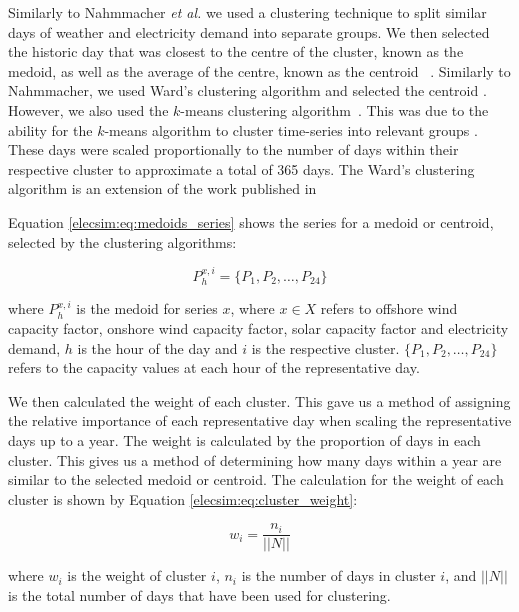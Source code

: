 Similarly to Nahmmacher \textit{et al.} we used a clustering technique to split similar days of weather and electricity demand into separate groups. We then selected the historic day that was closest to the centre of the cluster, known as the medoid, as well as the average of the centre, known as the centroid ~\cite{Nahmmacher2016}. Similarly to Nahmmacher, we used Ward's clustering algorithm and selected the centroid \cite{doi:10.1080/01621459.1963.10500845}. However, we also used the $k$-means clustering algorithm~\cite{forgy65}. This was due to the ability for the $k$-means algorithm to cluster time-series into relevant groups \cite{Kell2018}. These days were scaled proportionally to the number of days within their respective cluster to approximate a total of 365 days. The Ward's clustering algorithm is an extension of the work published in \cite{Kell2020}

Equation \ref{elecsim:eq:medoids_series} shows the series for a medoid or centroid, selected by the clustering algorithms:

\begin{equation}
\label{elecsim:eq:medoids_series}
P^{x,i}_{h}=\{P_1, P_2, \ldots, P_{24}\}
\end{equation}

\noindent where $P^{x,i}_{h}$ is the medoid for series $x$, where $x\in X$ refers to offshore wind capacity factor, onshore wind capacity factor, solar capacity factor and electricity demand, $h$ is the hour of the day and $i$ is the respective cluster. $\{P_1, P_2, \ldots , P_{24}\}$ refers to the capacity values at each hour of the representative day.

We then calculated the weight of each cluster. This gave us a method of assigning the relative importance of each representative day when scaling the representative days up to a year. The weight is calculated by the proportion of days in each cluster. This gives us a method of determining how many days within a year are similar to the selected medoid or centroid. The calculation for the weight of each cluster is shown by Equation \ref{elecsim:eq:cluster_weight}:

\begin{equation}
\label{elecsim:eq:cluster_weight}
w_i = \frac{n_i}{||N||} 
\end{equation} 

\noindent where $w_i$ is the weight of cluster $i$, $n_i$ is the number of days in cluster $i$, and $||N||$ is the total number of days that have been used for clustering. 


